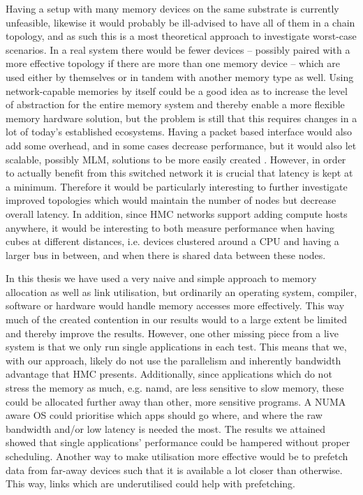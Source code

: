 Having a setup with many memory devices on the same substrate is currently unfeasible, likewise it would probably be ill-advised to have all of them in a chain topology, and as such this is a most theoretical approach to investigate worst-case scenarios. In a real system there would be fewer devices -- possibly paired with a more effective topology if there are more than one memory device -- which are used either by themselves or in tandem with another memory type as well. Using network-capable memories by itself could be a good idea as to increase the level of abstraction for the entire memory system and thereby enable a more flexible memory hardware solution, but the problem is still that this requires changes in a lot of today's established ecosystems. Having a packet based interface would also add some overhead, and in some cases decrease performance, but it would also let scalable, possibly MLM, solutions to be more easily created \cite{8167757}. However, in order to actually benefit from this switched network it is crucial that latency is kept at a minimum. Therefore it would be particularly interesting to further investigate improved topologies which would maintain the number of nodes but decrease overall latency. In addition, since HMC networks support adding compute hosts anywhere, it would be interesting to both measure performance when having cubes at different distances, i.e. devices clustered around a CPU and having a larger bus in between, and when there is shared data between these nodes.
\bigskip

In this thesis we have used a very naive and simple approach to memory allocation as well as link utilisation, but ordinarily an operating system, compiler, software or hardware would handle memory accesses more effectively. This way much of the created contention in our results would to a large extent be limited and thereby improve the results. However, one other missing piece from a live system is that we only run single applications in each test. This means that we, with our approach, likely do not use the parallelism and inherently bandwidth advantage that HMC presents. Additionally, since applications which do not stress the memory as much, e.g. namd, are less sensitive to slow memory, these could be allocated further away than other, more sensitive programs. A NUMA aware OS could prioritise which apps should go where, and where the raw bandwidth and/or low latency is needed the most. The results we attained showed that single applications' performance could be hampered without proper scheduling. Another way to make utilisation more effective would be to prefetch data from far-away devices such that it is available a lot closer than otherwise. This way, links which are underutilised could help with prefetching. 
\bigskip

